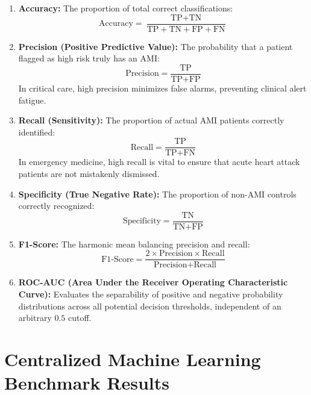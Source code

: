 \begin{enumerate}
    \item \textbf{Accuracy:} The proportion of total correct classifications:
    \begin{equation}
    \text{Accuracy} = \frac{\text{TP} + \text{TN}}{\text{TP} + \text{TN} + \text{FP} + \text{FN}}
    \end{equation}
    
    \item \textbf{Precision (Positive Predictive Value):} The probability that a patient flagged as high risk truly has an AMI:
    \begin{equation}
    \text{Precision} = \frac{\text{TP}}{\text{TP} + \text{FP}}
    \end{equation}
    In critical care, high precision minimizes false alarms, preventing clinical alert fatigue.
    
    \item \textbf{Recall (Sensitivity):} The proportion of actual AMI patients correctly identified:
    \begin{equation}
    \text{Recall} = \frac{\text{TP}}{\text{TP} + \text{FN}}
    \end{equation}
    In emergency medicine, high recall is vital to ensure that acute heart attack patients are not mistakenly dismissed.
    
    \item \textbf{Specificity (True Negative Rate):} The proportion of non-AMI controls correctly recognized:
    \begin{equation}
    \text{Specificity} = \frac{\text{TN}}{\text{TN} + \text{FP}}
    \end{equation}
    
    \item \textbf{F1-Score:} The harmonic mean balancing precision and recall:
    \begin{equation}
    \text{F1-Score} = \frac{2 \times \text{Precision} \times \text{Recall}}{\text{Precision} + \text{Recall}}
    \end{equation}
    
    \item \textbf{ROC-AUC (Area Under the Receiver Operating Characteristic Curve):} Evaluates the separability of positive and negative probability distributions across all potential decision thresholds, independent of an arbitrary $0.5$ cutoff.
\end{enumerate}

\section{Centralized Machine Learning Benchmark Results}
\label{sec:centralized_results}

